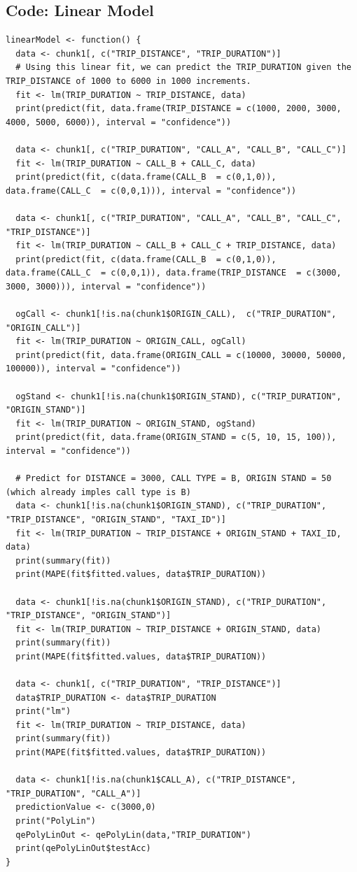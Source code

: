 \documentclass{article}
\numberwithin{equation}{section}
\begin{document}
\subsection{Code: Linear Model} 
\begin{lstlisting}
linearModel <- function() {
  data <- chunk1[, c("TRIP_DISTANCE", "TRIP_DURATION")]
  # Using this linear fit, we can predict the TRIP_DURATION given the TRIP_DISTANCE of 1000 to 6000 in 1000 increments.
  fit <- lm(TRIP_DURATION ~ TRIP_DISTANCE, data)
  print(predict(fit, data.frame(TRIP_DISTANCE = c(1000, 2000, 3000, 4000, 5000, 6000)), interval = "confidence"))
  
  data <- chunk1[, c("TRIP_DURATION", "CALL_A", "CALL_B", "CALL_C")]
  fit <- lm(TRIP_DURATION ~ CALL_B + CALL_C, data)
  print(predict(fit, c(data.frame(CALL_B  = c(0,1,0)), data.frame(CALL_C  = c(0,0,1))), interval = "confidence"))
  
  data <- chunk1[, c("TRIP_DURATION", "CALL_A", "CALL_B", "CALL_C", "TRIP_DISTANCE")]
  fit <- lm(TRIP_DURATION ~ CALL_B + CALL_C + TRIP_DISTANCE, data)
  print(predict(fit, c(data.frame(CALL_B  = c(0,1,0)), data.frame(CALL_C  = c(0,0,1)), data.frame(TRIP_DISTANCE  = c(3000, 3000, 3000))), interval = "confidence"))
  
  ogCall <- chunk1[!is.na(chunk1$ORIGIN_CALL),  c("TRIP_DURATION", "ORIGIN_CALL")]
  fit <- lm(TRIP_DURATION ~ ORIGIN_CALL, ogCall)
  print(predict(fit, data.frame(ORIGIN_CALL = c(10000, 30000, 50000, 100000)), interval = "confidence"))
  
  ogStand <- chunk1[!is.na(chunk1$ORIGIN_STAND), c("TRIP_DURATION", "ORIGIN_STAND")]
  fit <- lm(TRIP_DURATION ~ ORIGIN_STAND, ogStand)
  print(predict(fit, data.frame(ORIGIN_STAND = c(5, 10, 15, 100)), interval = "confidence"))
  
  # Predict for DISTANCE = 3000, CALL TYPE = B, ORIGIN STAND = 50 (which already imples call type is B)
  data <- chunk1[!is.na(chunk1$ORIGIN_STAND), c("TRIP_DURATION", "TRIP_DISTANCE", "ORIGIN_STAND", "TAXI_ID")]
  fit <- lm(TRIP_DURATION ~ TRIP_DISTANCE + ORIGIN_STAND + TAXI_ID, data)
  print(summary(fit))
  print(MAPE(fit$fitted.values, data$TRIP_DURATION))
  
  data <- chunk1[!is.na(chunk1$ORIGIN_STAND), c("TRIP_DURATION", "TRIP_DISTANCE", "ORIGIN_STAND")]
  fit <- lm(TRIP_DURATION ~ TRIP_DISTANCE + ORIGIN_STAND, data)
  print(summary(fit))
  print(MAPE(fit$fitted.values, data$TRIP_DURATION))
  
  data <- chunk1[, c("TRIP_DURATION", "TRIP_DISTANCE")]
  data$TRIP_DURATION <- data$TRIP_DURATION
  print("lm")
  fit <- lm(TRIP_DURATION ~ TRIP_DISTANCE, data)
  print(summary(fit))
  print(MAPE(fit$fitted.values, data$TRIP_DURATION))
  
  data <- chunk1[!is.na(chunk1$CALL_A), c("TRIP_DISTANCE", "TRIP_DURATION", "CALL_A")]
  predictionValue <- c(3000,0)
  print("PolyLin")
  qePolyLinOut <- qePolyLin(data,"TRIP_DURATION")
  print(qePolyLinOut$testAcc)
}
\end{lstlisting}
\end{document}
